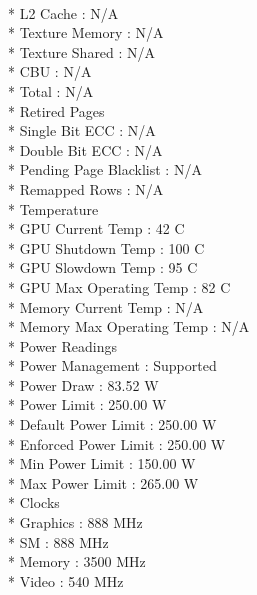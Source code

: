 \documentclass{article}
\begin{document}
    \\*             L2 Cache                  : N/A
    \\*             Texture Memory            : N/A
  \\*               Texture Shared            : N/A
  \\*               CBU                       : N/A
  \\*               Total                     : N/A
 \\*    Retired Pages
  \\*       Single Bit ECC                    : N/A
 \\*      Double Bit ECC                    : N/A
  \\*       Pending Page Blacklist            : N/A
  \\*   Remapped Rows                         : N/A
 \\*    Temperature
  \\*       GPU Current Temp                  : 42 C
   \\*      GPU Shutdown Temp                 : 100 C
   \\*      GPU Slowdown Temp                 : 95 C
  \\*       GPU Max Operating Temp            : 82 C
   \\*      Memory Current Temp               : N/A
   \\*      Memory Max Operating Temp         : N/A
   \\*  Power Readings
    \\*     Power Management                  : Supported
   \\*      Power Draw                        : 83.52 W
   \\*      Power Limit                       : 250.00 W
   \\*      Default Power Limit               : 250.00 W
  \\*       Enforced Power Limit              : 250.00 W
  \\*       Min Power Limit                   : 150.00 W
   \\*      Max Power Limit                   : 265.00 W
  \\*   Clocks
  \\*       Graphics                          : 888 MHz
  \\*       SM                                : 888 MHz
   \\*      Memory                            : 3500 MHz
    \\*     Video                             : 540 MHz
\end{document}
